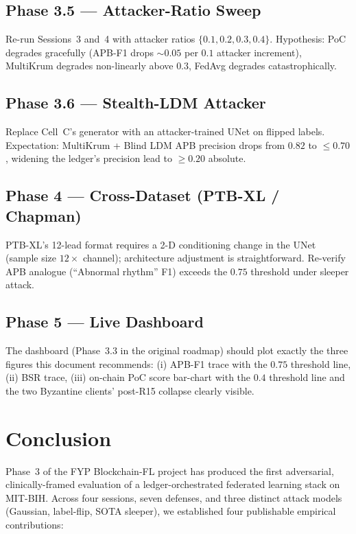 \documentclass[11pt,a4paper]{article}
\begin{document}
\subsection{Phase 3.5 --- Attacker-Ratio Sweep}

Re-run Sessions~3 and~4 with attacker ratios $\{0.1, 0.2, 0.3, 0.4\}$.
Hypothesis: PoC degrades gracefully (APB-F1 drops $\sim 0.05$ per
$0.1$ attacker increment), MultiKrum degrades non-linearly above $0.3$,
FedAvg degrades catastrophically.

\subsection{Phase 3.6 --- Stealth-LDM Attacker}

Replace Cell~C's generator with an attacker-trained UNet on flipped
labels. Expectation: MultiKrum + Blind LDM APB precision drops from
$0.82$ to $\leq 0.70$, widening the ledger's precision lead to
$\geq 0.20$ absolute.

\subsection{Phase 4 --- Cross-Dataset (PTB-XL / Chapman)}

PTB-XL's 12-lead format requires a 2-D conditioning change in the
UNet (sample size $12\times$ channel); architecture adjustment is
straightforward. Re-verify APB analogue (``Abnormal rhythm'' F1) exceeds
the $0.75$ threshold under sleeper attack.

\subsection{Phase 5 --- Live Dashboard}

The dashboard (Phase~3.3 in the original roadmap) should plot exactly
the three figures this document recommends: (i) APB-F1 trace with the
$0.75$ threshold line, (ii) BSR trace, (iii) on-chain PoC score
bar-chart with the $0.4$ threshold line and the two Byzantine clients'
post-R15 collapse clearly visible.

\section{Conclusion}
\label{sec:conclusion}

Phase~3 of the FYP Blockchain-FL project has produced the first
adversarial, clinically-framed evaluation of a ledger-orchestrated
federated learning stack on MIT-BIH. Across four sessions, seven
defenses, and three distinct attack models (Gaussian, label-flip,
SOTA sleeper), we established four publishable empirical contributions:
\end{document}
